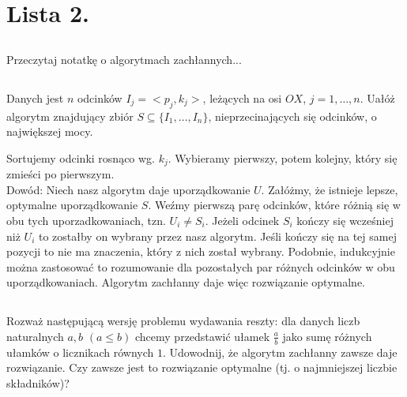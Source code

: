 \documentclass[svgnames]{report}
\begin{document}
\section{}%

\chapter{Lista 2.}
\section{}
\begin{framed}
Przeczytaj notatkę o algorytmach zachłannych...
\end{framed}
\section{}
\begin{framed}
Danych jest $n$ odcinków $I_j = <p_j,k_j>$, leżących na osi $OX$, $j = 1,\dots,n$. Uałóż algorytm
znajdujący zbiór $S \subseteq \{ I_1,\dots,I_n \}$, nieprzecinających się odcinków, o największej mocy.
\end{framed}

Sortujemy odcinki rosnąco wg. $k_j$. Wybieramy pierwszy, potem kolejny, który się zmieści po pierwszym.\\

\noindent Dowód: Niech nasz algorytm daje uporządkowanie $U$. Załóżmy, że istnieje lepsze, optymalne uporządkowanie $S$. Weźmy pierwszą parę odcinków, które różnią się w obu tych uporzadkowaniach, tzn. $U_i \ne S_i$. Jeżeli odcinek $S_i$ kończy się wcześniej niż $U_i$ to zostałby on wybrany przez nasz algorytm. Jeśli kończy się na tej samej pozycji to nie ma znaczenia, który z nich został wybrany. Podobnie, indukcyjnie można zastosować to rozumowanie dla pozostałych par różnych odcinków w obu uporządkowaniach. Algorytm zachłanny daje więc rozwiązanie optymalne.


\section{}
\begin{framed}
Rozważ następującą wersję problemu wydawania reszty: dla danych liczb naturalnych
$a, b$ $(a \leq b)$ chcemy przedstawić ułamek $\frac{a}{b}$ jako sumę różnych ułamków o licznikach równych
$1$. Udowodnij, że algorytm zachłanny zawsze daje rozwiązanie. Czy zawsze jest to rozwiązanie optymalne (tj. o najmniejszej liczbie składników)?
\end{framed}
\end{document}
